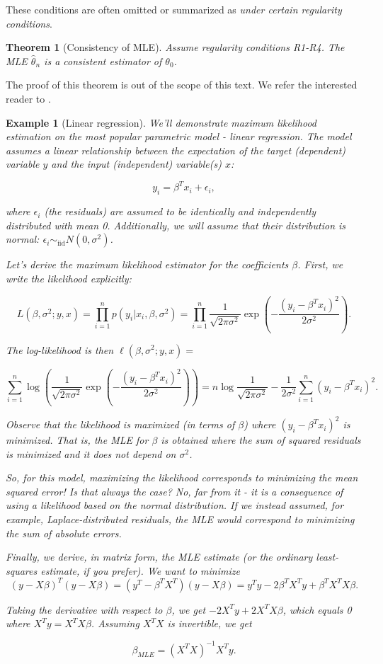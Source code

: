 \documentclass{book}
\theoremstyle{plain}%
\newtheorem{prototheorem}{Example}[section]
\newenvironment{cexample}
   {\colorlet{shadecolor}{gray!10}\begin{shaded}\begin{prototheorem}}
   {\end{prototheorem}\end{shaded}}
\newtheorem{theorem}{Theorem}[section]
\theoremstyle{definition}
\begin{document}
These conditions are often omitted or summarized as \emph{under certain regularity conditions}.

\begin{theorem}[Consistency of MLE] Assume regularity conditions R1-R4. The MLE $\hat{\theta}_n$ is a consistent estimator of $\theta_0$.
\end{theorem}

The proof of this theorem is out of the scope of this text. We refer the interested reader to \citet[ch. 6.]{Hogg2005}.

\begin{cexample}[Linear regression] We'll demonstrate maximum likelihood estimation on the most popular parametric model - linear regression. The model assumes a linear relationship between the expectation of the target (dependent) variable $y$ and the input (independent) variable(s) $x$:

$$y_i = \beta^T x_i + \epsilon_i,$$

where $\epsilon_i$ (the residuals) are assumed to be identically and independently distributed with mean 0. Additionally, we will assume that their distribution is normal: $\epsilon_i \sim_\text{iid} N(0, \sigma^2)$.

Let's derive the maximum likelihood estimator for the coefficients $\beta$. First, we write the likelihood explicitly:

$$L(\beta, \sigma^2; y, x) = \prod_{i=1}^n p(y_i|x_i,\beta,\sigma^2) = \prod_{i=1}^n \frac{1}{\sqrt{2\pi\sigma^2}}\exp(-\frac{(y_i - \beta^Tx_i)^2}{2\sigma^2}).$$

The log-likelihood is then $\ell(\beta, \sigma^2; y, x) =$

$$\sum_{i=1}^n \log{\left(\frac{1}{\sqrt{2\pi\sigma^2}}\exp(-\frac{(y_i - \beta^Tx_i)^2}{2\sigma^2})\right)} = n\log\frac{1}{\sqrt{2\pi\sigma^2}} - \frac{1}{2\sigma^2}\sum_{i=1}^n (y_i - \beta^Tx_i)^2.$$

Observe that the likelihood is maximized (in terms of $\beta$) where $(y_i - \beta^Tx_i)^2$ is minimized. That is, the MLE for $\beta$ is obtained where the sum of squared residuals is minimized and it does not depend on $\sigma^2$.

So, for this model, maximizing the likelihood corresponds to minimizing the mean squared error! Is that always the case? No, far from it - it is a consequence of using a likelihood based on the normal distribution. If we instead assumed, for example, Laplace-distributed residuals, the MLE would correspond to minimizing the sum of absolute errors.

Finally, we derive, in matrix form, the MLE estimate (or the ordinary least-squares estimate, if you prefer). We want to minimize $$(y - X\beta)^T(y -  X\beta) = (y^T - \beta^TX^T)(y -  X\beta) = y^Ty - 2\beta^TX^Ty+ \beta^TX^TX\beta .$$

Taking the derivative with respect to $\beta$, we get $- 2X^Ty+ 2X^TX\beta$, which equals 0 where  $X^Ty = X^TX\beta$. Assuming $X^TX$ is invertible, we get

$$\beta_{MLE}=(X^TX)^{-1}X^Ty.$$
\end{cexample}
\end{document}
